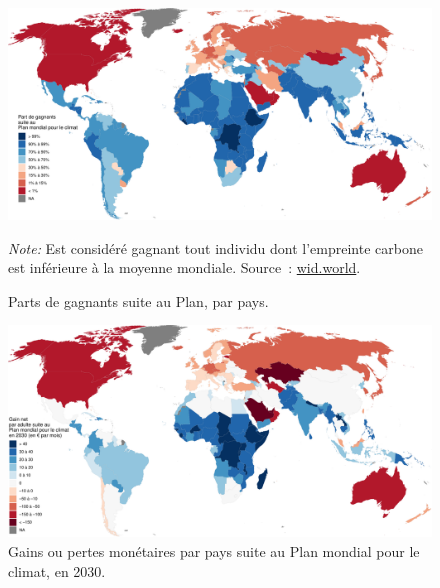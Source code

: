 \documentclass[a5paper,french,openany]{memoir}
\begin{document}
\begin{figure}[h]
  \caption[Parts de gagnants par pays]{Parts de gagnants suite au Plan, par pays.}\label{fig:share_below_global_mean}
  \centerline{
    \includegraphics[width=.8\paperwidth]{../figures/maps/share_below_global_mean.pdf}
    } 
  {\footnotesize \textit{Note:} Est considéré gagnant tout individu dont l'empreinte carbone est inférieure à la moyenne mondiale. Source~: \href{http://wid.world}{wid.world}.}
\end{figure}
\begin{figure}[h]
  \caption[Gains nets par pays en 2030]{Gains ou pertes monétaires par pays suite au Plan mondial pour le climat, en 2030.}\label{fig:gain_2030}
  \centerline{\includegraphics[width=.8\paperwidth]{../figures/maps/gain_adj_2030_fr.pdf}} %
\end{figure}
\end{document}
